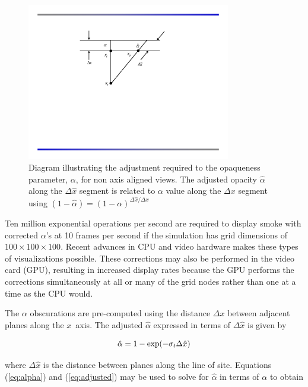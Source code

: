{\begin{figure}[\figoptions]
\centerline{\includegraphics[width=3.5in]{FIGURES/forney_figure4}}
\caption [Diagram illustrating the adjustment required to the
opaqueness parameter, $\alpha$, for non-axis aligned views.] {
Diagram illustrating the adjustment required to the opaqueness
parameter, $\alpha$, for non axis aligned views. The adjusted
opacity $\hat{\alpha}$ along the $\Delta\hat{x}$ segment is
related to $\alpha$ value along the $\Delta x$ segment using
$(1-\hat{\alpha})=(1-\alpha)^{\Delta \hat{x}/\Delta x}$}
\label{figray}
\end{figure}

Ten million exponential operations per second are required to
display smoke with corrected $\alpha$'s at 10 frames per second if
the simulation has grid dimensions of $100\times 100\times 100$.
Recent advances in CPU and video hardware makes these types of
visualizations possible. These corrections may also be performed
in the video card (GPU), resulting in increased display rates
because the GPU performs the corrections simultaneously at all or
many of the grid nodes rather than one at a time as the CPU would.

The $\alpha$ obscurations are pre-computed using the distance
$\Delta x$ between adjacent planes along the $x$~axis. The
adjusted $\hat{\alpha}$ expressed in terms of $\Delta\hat{x}$ is
given by

\begin{equation}
\label{eq:adjusted}
\hat{\alpha}=1-\exp(-\sigma_t\Delta \hat{x})\\
\end{equation}

where $\Delta\hat{x}$ is the distance between planes along the
line of site.  Equations (\ref{eq:alpha}) and (\ref{eq:adjusted})
may be used to solve for $\hat{\alpha}$ in terms of $\alpha$ to
obtain

}
